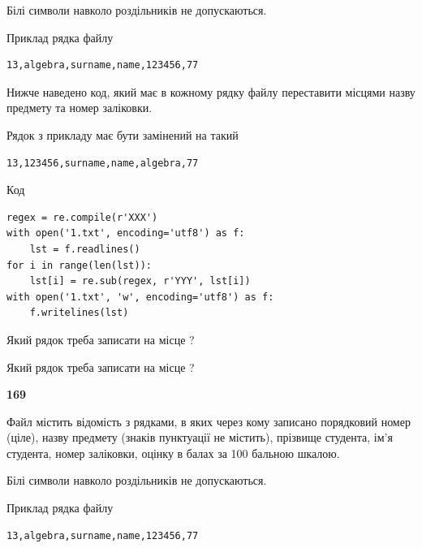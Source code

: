 Білі символи навколо роздільників не допускаються.

Приклад рядка файлу



\begin{verbatim}
13,algebra,surname,name,123456,77
\end{verbatim}


Нижче наведено код, який має в кожному рядку файлу переставити місцями назву предмету та номер заліковки.

Рядок з прикладу має бути замінений на такий



\begin{verbatim}
13,123456,surname,name,algebra,77
\end{verbatim}




Код



\begin{verbatim}
regex = re.compile(r'XXX')
with open('1.txt', encoding='utf8') as f:
    lst = f.readlines()
for i in range(len(lst)):
    lst[i] = re.sub(regex, r'YYY', lst[i])
with open('1.txt', 'w', encoding='utf8') as f:
    f.writelines(lst)
\end{verbatim}







Який рядок треба записати на місце  ?\par
\vspace{5mm}


Який рядок треба записати на місце  ?\par


\newpage

{\begin {center}\textbf{ 169}\end {center}}\par
Файл  містить відомість з рядками, в яких через кому записано поряд\-ковий номер (ціле), назву предмету (знаків пунктуації не містить), прізвище студента, ім'я студента, номер заліковки, оцінку в балах за 100 бальною шкалою.

Білі символи навколо роздільників не допускаються.

Приклад рядка файлу



\begin{verbatim}
13,algebra,surname,name,123456,77
\end{verbatim}


